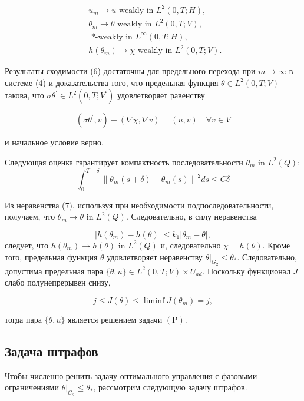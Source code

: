\[
    \begin{aligned}
        & u_{m} \rightarrow u \text { weakly in } L^{2}(0, T ; H), \\
        & \theta_{m} \rightarrow \theta \text { weakly in } L^{2}(0, T ; V) \text {, } \\
        & \text { *-weakly in } L^{\infty}(0, T ; H) \text {, } \\
        & h\left(\theta_{m}\right) \rightarrow \chi \text { weakly in } L^{2}(0, T ; V) \text {. }
    \end{aligned}
\]

Результаты сходимости (6) достаточны для предельного перехода
при $m \rightarrow \infty$ в системе (4) и доказательства того,
что предельная функция $\theta \in L^{2}(0, T ; V) $ такова,
что $\sigma \theta^{\prime} \in L^{2}\left(0, T ; V^{\prime}\right)$ удовлетворяет равенству

\[ \left(\sigma \theta^{\prime}, v\right)+(\nabla \chi, \nabla v)=(u, v) \quad \forall v \in V \]

и начальное условие верно.

Следующая оценка гарантирует компактность последовательности $\theta_{m}$ in $L^{2}(Q)$:
\[ \int_{0}^{T-\delta}\left\|\theta_{m}(s+\delta)-\theta_{m}(s)\right\|^{2} d s \leq C \delta \]

Из неравенства (7), используя при необходимости подпоследовательности, получаем, что
$\theta_{m} \rightarrow \theta$ in $L^{2}(Q)$.
Следовательно, в силу неравенства

\[ \left|h\left(\theta_{m}\right)-h(\theta)\right| \leq k_{1}\left|\theta_{m}-\theta\right|, \]
следует, что $h\left(\theta_{m}\right) \rightarrow h(\theta)$ in $L^{2}(Q)$
и, следовательно $\chi=h(\theta)$.
Кроме того, предельная функция $\theta$ удовлетворяет неравенству
$\left.\theta\right|_{G_{2}} \leq \theta_{*}$.
Следовательно, допустима предельная пара $\{\theta, u\} \in L^{2}(0, T ; V) \times U_{a d}$.
Поскольку функционал $J$ слабо полунепрерывен снизу,

\[ j \leq J(\theta) \leq \liminf J\left(\theta_{m}\right)=j, \]

тогда пара $\{\theta, u\}$ является решением задачи $(\mathrm{P})$.

\subsection{Задача штрафов}

Чтобы численно решить задачу оптимального управления с фазовыми ограничениями
$\left.\theta\right|_{G_{2}} \leq \theta_{*}$, рассмотрим следующую задачу штрафов.

